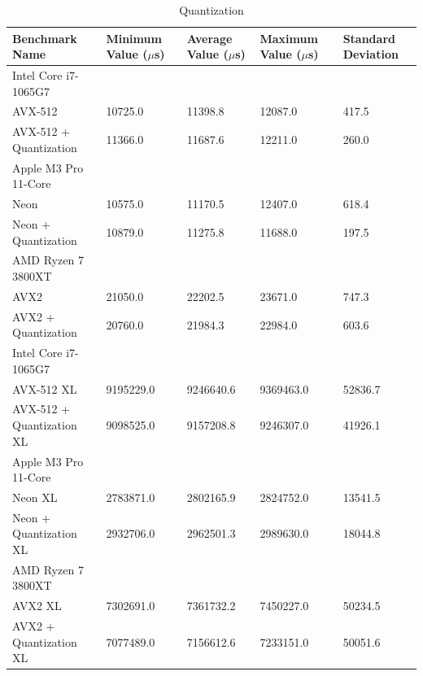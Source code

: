 \documentclass[modern,longauthor]{aastex7}
\begin{document}
\begin{table}[htb!]
\centering

\caption{Quantization\label{tab:quantization}}
\begin{tabular}{p{5.5cm} p{2cm} p{2cm} p{2cm} p{2cm}}
\hline
Benchmark Name & Minimum Value ($\mu$s) & Average Value ($\mu$s) & Maximum Value ($\mu$s) & Standard Deviation \\
\hline
Intel Core i7-1065G7 \\
\hspace{0.5cm}AVX-512 & 10725.0 & 11398.8 & 12087.0 & 417.5 \\
\hspace{0.5cm}AVX-512 + Quantization & 11366.0 & 11687.6 & 12211.0 & 260.0 \\
Apple M3 Pro 11-Core \\
\hspace{0.5cm}Neon & 10575.0 & 11170.5 & 12407.0 & 618.4 \\
\hspace{0.5cm}Neon + Quantization & 10879.0 & 11275.8 & 11688.0 & 197.5 \\
AMD Ryzen 7 3800XT \\
\hspace{0.5cm}AVX2 & 21050.0 & 22202.5 & 23671.0 & 747.3 \\
\hspace{0.5cm}AVX2 + Quantization & 20760.0 & 21984.3 & 22984.0 & 603.6 \\
\hline
Intel Core i7-1065G7 \\
\hspace{0.5cm}AVX-512 XL & 9195229.0 & 9246640.6 & 9369463.0 & 52836.7 \\
\hspace{0.5cm}AVX-512 + Quantization XL & 9098525.0 & 9157208.8 & 9246307.0 & 41926.1 \\
Apple M3 Pro 11-Core \\
\hspace{0.5cm}Neon XL & 2783871.0 & 2802165.9 & 2824752.0 & 13541.5 \\
\hspace{0.5cm}Neon + Quantization XL & 2932706.0 & 2962501.3 & 2989630.0 & 18044.8 \\
AMD Ryzen 7 3800XT \\
\hspace{0.5cm}AVX2 XL & 7302691.0 & 7361732.2 & 7450227.0 & 50234.5 \\
\hspace{0.5cm}AVX2 + Quantization XL & 7077489.0 & 7156612.6 & 7233151.0 & 50051.6 \\
\hline
\end{tabular}
\end{table}
\FloatBarrier
\end{document}

